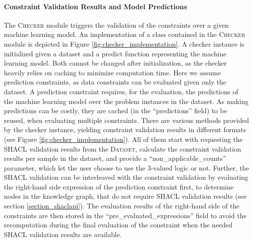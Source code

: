 \paragraph{Constraint Validation Results and Model Predictions} The \textsc{Checker} module triggers the validation of the constraints over a given machine learning model. An implementation of a class contained in the \textsc{Checker} module is depicted in Figure \ref{fig:checker_implementation}. A checker instance is initialized given a dataset and a predict function representing the machine learning model. Both cannot be changed after initialization, as the checker heavily relies on caching to minimize computation time. Here we assume prediction constraints, as data constraints can be evaluated given only the dataset. A prediction constraint requires, for the evaluation, the predictions of the machine learning model over the problem instances in the dataset. As making predictions can be costly, they are cached (in the ``predictions'' field) to be reused, when evaluating multiple constraints. There are various methods provided by the checker instance, yielding constraint validation results in different formats (see Figure \ref{fig:checker_implementation}). All of them start with requesting the SHACL validation results from the \textsc{Dataset}, calculate the constraint validation results per sample in the dataset, and provide a ``non\_applicable\_counts'' parameter, which let the user choose to use the 3-valued logic or not. Further, the SHACL validation can be interleaved with the constraint validation by evaluating the right-hand side expression of the prediction constraint first, to determine nodes in the knowledge graph, that do not require SHACL validation results (see section \ref{section_shaclapi}). The evaluation results of the right-hand side of the constraints are then stored in the ``pre\_evaluated\_expressions'' field to avoid the recomputation during the final evaluation of the constraint when the needed SHACL validation results are available.

